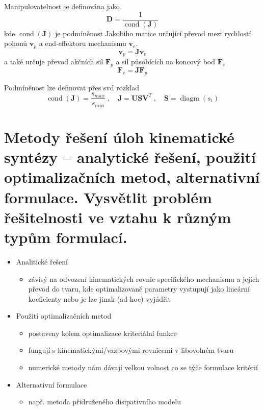 \documentclass{article}
\begin{document}
	Manipulovatelnost je definována jako
	\begin{equation}
		\bm{D} = \frac{1}{\operatorname{cond}(\bm{J})}
	\end{equation}
	kde $\operatorname{cond}(\bm{J})$ je podmíněnost Jakobiho matice určující převod mezi rychlostí pohonů $\bm{v}_p$ a end-effektoru mechanismu $\bm{v}_e$.
	\begin{equation}
		\bm{v}_p = \bm{J} \bm{v}_e
	\end{equation}
	a také určuje převod akčních sil $\bm{F}_p$ a sil působících na koncový bod $\bm{F}_e$
	\begin{equation}
		\bm{F}_e = \bm{J} \bm{F}_p
	\end{equation}

	Podmíněnost lze definovat přes svd rozklad
	\begin{equation}
		\operatorname{cond}(\bm{J}) = \frac{s_{max}}{s_{min}}
		\;,\quad 
		\bm{J} = \bm{U} \bm{S} \bm{V}^T
		\;,\quad 
		\bm{S} = \operatorname{diagm}(s_i)
	\end{equation}

	\section{Metody řešení úloh kinematické syntézy – analytické řešení, použití optimalizačních metod, alternativní formulace. Vysvětlit problém řešitelnosti ve vztahu k různým typům formulací.}

	\begin{itemize}
	\item Analitické řešení
	\begin{itemize}
		\item závisý na odvození kinematických rovnic specifického mechanismu a jejich převod do tvaru, kde optimalizované parametry vystupují jako lineární koeficienty nebo je lze jinak (ad-hoc) vyjádřit
	\end{itemize}
	\item Použití optimalizačních metod
		\begin{itemize}
		\item postaveny kolem optimalizace kriteriální funkce
		\item fungují s kinematickými/vazbovými rovnicemi v libovolném tvaru
		\item numerické metody nám dávají velkou volnost co se týče formulace kritérií
		\end{itemize}
	\item Alternativní formulace
		\begin{itemize}
		\item např. metoda přidruženého disipativního modelu
		\end{itemize}
	\end{itemize}
\end{document}
